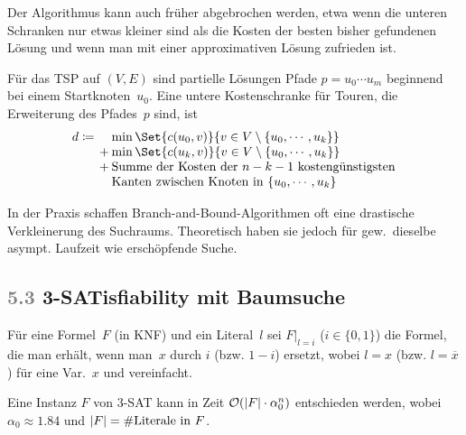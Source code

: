 \documentclass{cheat-sheet}
\renewcommand{\O}{\mathcal{O}} %
\newcommand{\Problem}[1]{\textcolor{ProblemColor}{\textbf{#1}}}
\newcommand{\scriptSection}[1]{\textcolor{gray}{#1}\enspace}
\begin{document}
\begin{bem}
  Der Algorithmus kann auch früher abgebrochen werden, etwa wenn die unteren Schranken nur etwas kleiner sind als die Kosten der besten bisher gefundenen Lösung und wenn man mit einer approximativen Lösung zufrieden ist.
\end{bem}

\begin{bsp}
  Für das TSP auf $(V, E)$ sind partielle Lösungen Pfade $p = u_0 \cdots u_m$ beginnend bei einem Startknoten~$u_0$.
  Eine untere Kostenschranke für Touren, die Erweiterung des Pfades~$p$ sind, ist
  \[
    \arraycolsep=1pt
    d \coloneqq
    \begin{array}[t]{r l}
      & \min \Set{c(u_0, v)}{v \in V \setminus \{ u_0, \cdots, u_k \}} \\
      +& \min \Set{c(u_k, v)}{v \in V \setminus \{ u_0, \cdots, u_k \}} \\
      +& \text{Summe der Kosten der $n-k-1$ kostengünstigsten} \\
      & \text{Kanten zwischen Knoten in } \{ u_0, \cdots, u_k \}
    \end{array}
  \]
\end{bsp}

\begin{samepage}

\begin{bem}
  In der Praxis schaffen Branch-and-Bound-Algorithmen oft eine drastische Verkleinerung des Suchraums.
  Theoretisch haben sie jedoch für gew.\ dieselbe asympt. Laufzeit wie erschöpfende Suche.
\end{bem}

\subsection{\scriptSection{5.3} \Problem{3-SATisfiability} mit Baumsuche}

\begin{nota}
  Für eine Formel~$F$ (in KNF) und ein Literal~$l$ sei $F|_{l=i}$ ($i \!\in\! \{0,1\}$) die Formel, die man erhält, wenn man~$x$ durch $i$ (bzw. $1 \!-\! i$) ersetzt, wobei $l \!=\! x$ (bzw. $l \!=\! \overline{x}$) für eine Var.~$x$ und vereinfacht.
\end{nota}

\begin{satz}
  Eine Instanz $F$ von 3-SAT kann in Zeit $\O(\abs{F} \cdot \alpha_0^n)$ entschieden werden, wobei $\alpha_0 \approx 1.84$ und $\lvert F\rvert = \#\text{Literale in~$F$}$.
\end{satz}

\end{samepage}
\end{document}
